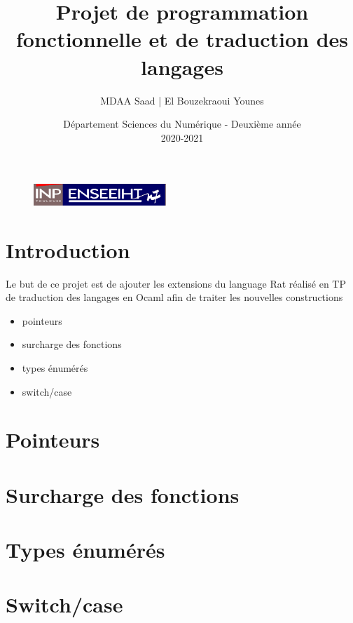 \documentclass{article}
\begin{document}
\begin{figure}[t]
\centering
\includegraphics[width=5cm]{inp_n7.png}
\end{figure}

\title{\vspace{4cm} \textbf{Projet de programmation fonctionnelle et de traduction des langages}}
\author{MDAA Saad | El Bouzekraoui Younes}
\date{\vspace{7cm} Département Sciences du Numérique - Deuxième année \\
2020-2021 }

\maketitle

\newpage
\tableofcontents

\newpage
\section{Introduction}
Le but de ce projet est de ajouter les extensions du language Rat  réalisé en TP de traduction des langages en Ocaml afin de traiter les nouvelles 
constructions 
\begin{itemize}
    \item pointeurs
    \item surcharge des fonctions
    \item types énumérés
    \item switch/case
\end{itemize}
\section{Pointeurs}
\section{Surcharge des fonctions}
\section{Types énumérés}
\section{Switch/case}
\end{document}
